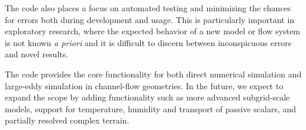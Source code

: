 \documentclass[gmd, manuscript]{copernicus}
\begin{document}
The code also places a focus on automated testing and minimizing the chances for errors both during development and usage.
This is particularly important in exploratory research, where the expected behavior of a new model or flow system is not known \emph{a priori} and it is difficult to discern between inconspicuous errors and novel results.

The code provides the core functionality for both direct numerical simulation and large-eddy simulation in channel-flow geometries.
In the future, we expect to expand the scope by adding functionality such as more advanced subgrid-scale models, support for temperature, humidity and transport of passive scalars, and partially resolved complex terrain.












\end{document}
